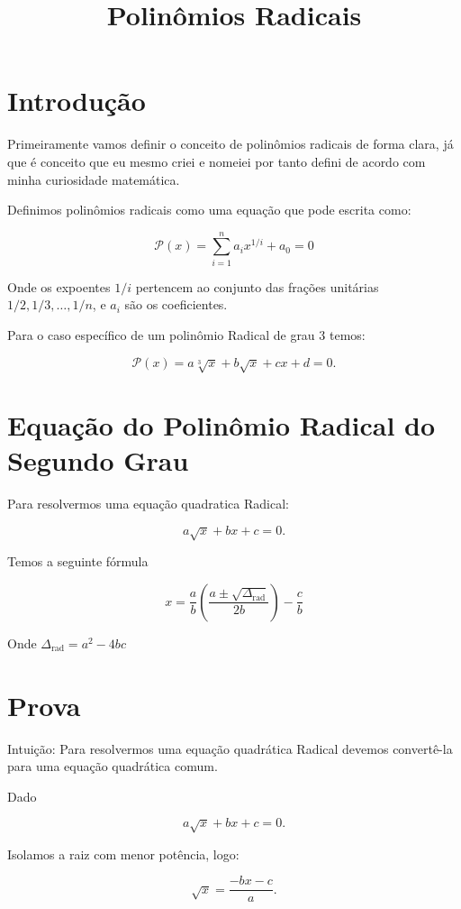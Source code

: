 \documentclass{article}
\title{Polinômios Radicais}
\author{}
\date{}
\begin{document}
\maketitle

\section{Introdução}

Primeiramente vamos definir o conceito de polinômios radicais de forma clara, já que é conceito que eu mesmo criei e nomeiei por tanto defini de acordo com minha curiosidade matemática.

Definimos polinômios radicais como uma equação que pode escrita como: 

\[
\mathcal{P}(x) = \sum_{i=1}^{n} a_i x^{1/i} + a_0 = 0
\]

Onde os expoentes $1/i$ pertencem ao conjunto das frações unitárias $1/2, 1/3, \dots, 1/n$, e $a_i$ são os coeficientes. 

Para o caso específico de um polinômio Radical de grau 3 temos:

\[
\mathcal{P}(x) = a\sqrt[3]{x} + b\sqrt{x} + cx + d = 0.
\]

\section{Equação do Polinômio Radical do Segundo Grau}

Para resolvermos uma equação quadratica Radical:

\[
a\sqrt{x} + bx + c = 0.
\]

Temos a seguinte fórmula

\[
x = \frac{a}{b}\left(\frac{a \pm \sqrt{\Delta_{\text{rad}}}}{2b}\right)- \frac{c}{b}
\]

Onde $\Delta_{\text{rad}}= a^2-4bc$

\clearpage

\section{Prova}

Intuição: Para resolvermos uma equação quadrática Radical devemos convertê-la para uma equação quadrática comum.

Dado

\[
a\sqrt{x} + bx + c = 0.
\]

Isolamos a raiz com menor potência, logo:

\[
\sqrt{x}= \frac{-bx - c}{a}.
\]
\end{document}
